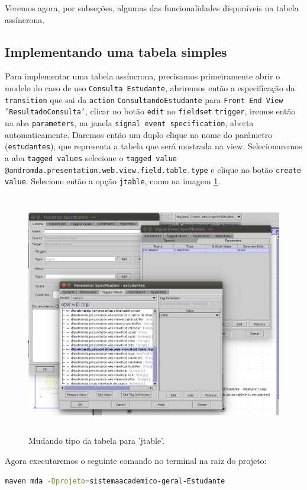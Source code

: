 Veremos agora, por subseções, algumas das funcionalidades disponíveis na tabela
assíncrona.

\subsection{Implementando uma tabela simples}
Para implementar uma tabela assíncrona, precisamos primeiramente abrir o modelo
do caso de uso \texttt{Consulta Estudante}, abriremos então a especificação da
\texttt{transition} que sai da \texttt{action} \texttt{ConsultandoEstudante}
para \texttt{Front End View} \texttt{'ResultadoConsulta'}, clicar no botão
\texttt{edit} no \texttt{fieldset} \texttt{trigger}, iremos então na aba
\texttt{parameters}, na janela \texttt{signal event specification}, aberta
automaticamente. Daremos então um duplo clique no nome do parâmetro
(\texttt{estudantes}), que representa a tabela que será mostrada na view.
Selecionaremos a aba \texttt{tagged values} selecione o \texttt{tagged value}
\texttt{@andromda.presentation.web.view.field.table.type} e clique no botão
\texttt{create value}. Selecione então a opção \texttt{jtable}, como na
imagem \ref{table_type_jtable}.
\begin{figure}[H]
	\centering
	\includegraphics[width=350pt,height=300pt]{files/imgs/tutorial-mdarte-0030.png}
	\caption{Mudando tipo da tabela para 'jtable'.}
	\label{table_type_jtable}
\end{figure}

Agora executaremos o seguinte comando no terminal na raiz do projeto:
\begin{lstlisting}[language=bash]
maven mda -Dprojeto=sistemaacademico-geral-Estudante
\end{lstlisting}

